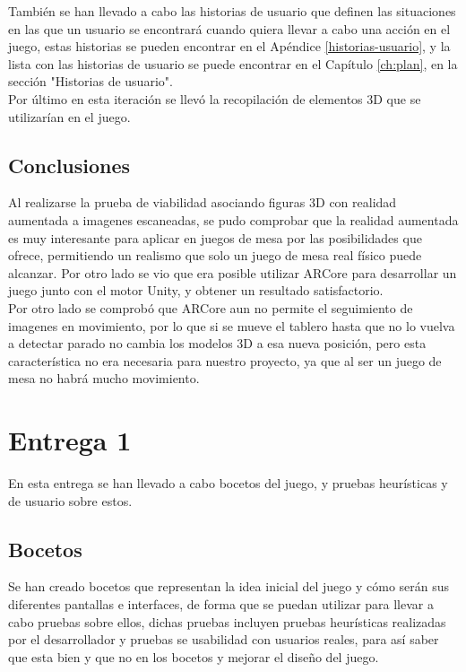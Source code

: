 También se han llevado a cabo las historias de usuario que definen las situaciones en las que un usuario se encontrará cuando quiera llevar a cabo una acción en el juego, estas historias se pueden encontrar en el Apéndice \ref{historias-usuario}, y la lista con las historias de usuario se puede encontrar en el Capítulo \ref{ch:plan}, en la sección "Historias de usuario".\\

Por último en esta iteración se llevó la recopilación de elementos 3D que se utilizarían en el juego.

\subsection{Conclusiones}
Al realizarse la prueba de viabilidad asociando figuras 3D con realidad aumentada a imagenes escaneadas, se pudo comprobar que la realidad aumentada es muy interesante para aplicar en juegos de mesa por las posibilidades que ofrece, permitiendo un realismo que solo un juego de mesa real físico puede alcanzar. Por otro lado se vio que era posible utilizar ARCore para desarrollar un juego junto con el motor Unity, y obtener un resultado satisfactorio.\\

Por otro lado se comprobó que ARCore aun no permite el seguimiento de imagenes en movimiento, por lo que si se mueve el tablero hasta que no lo vuelva a detectar parado no cambia los modelos 3D a esa nueva posición, pero esta característica no era necesaria para nuestro proyecto, ya que al ser un juego de mesa no habrá mucho movimiento.

\section{Entrega 1}
En esta entrega se han llevado a cabo bocetos del juego, y pruebas heurísticas y de usuario sobre estos.

\subsection{Bocetos}
Se han creado bocetos que representan la idea inicial del juego y cómo serán sus diferentes pantallas e interfaces, de forma que se puedan utilizar para llevar a cabo pruebas sobre ellos, dichas pruebas incluyen pruebas heurísticas realizadas por el desarrollador y pruebas se usabilidad con usuarios reales, para así saber que esta bien y que no en los bocetos y mejorar el diseño del juego.\\

